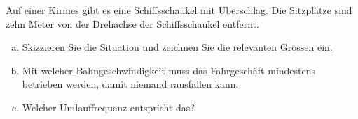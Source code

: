 
\begin{aufgabe}
	Auf einer Kirmes gibt es eine Schiffsschaukel mit Überschlag.
	Die Sitzplätze sind zehn Meter von der Drehachse der Schiffsschaukel entfernt.

	\begin{enumerate}[a)]
		\item Skizzieren Sie die Situation und zeichnen Sie die relevanten Grössen ein.
		\item Mit welcher Bahngeschwindigkeit muss das Fahrgeschäft mindestens betrieben werden,
			damit niemand rausfallen kann.
		\item Welcher Umlauffrequenz entspricht das? 
	\end{enumerate}

\end{aufgabe}
